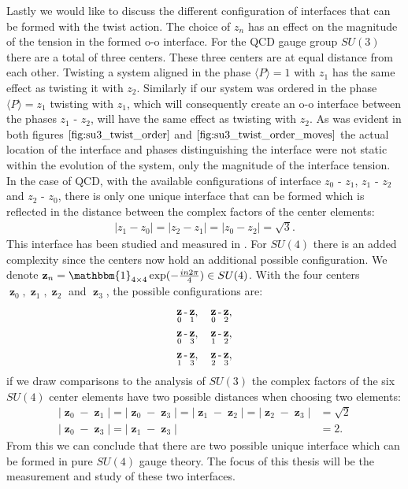 \documentclass[english,twoside,openright]{UH_TCM_MSc}
\DeclareMathOperator{\z}{\mathbf{z}}
\newcommand{\id}{\mathbbm{1}}
\begin{document}
Lastly we would like to discuss the different configuration of interfaces that can be formed with the twist action. The choice of $z_n$ has an effect on the magnitude of the tension in the formed o-o interface. For the QCD gauge group $SU(3)$ there are a total of three centers. These three centers are at equal distance from each other. Twisting a system aligned in the phase $\langle P \rangle = 1$ with $z_1$ has the same effect as twisting it with $z_2$. Similarly if our system was ordered in the phase  $\langle P \rangle = z_1$ twisting with $z_1$, which will consequently create an o-o interface between the phases $z_1$ - $z_2$, will have the same effect as twisting with $z_2$. As was evident in both figures $\ref{fig:su3_twist_order}$ and $\ref{fig:su3_twist_order_moves}$ the actual location of the interface and phases distinguishing the interface were not static within the evolution of the system, only the magnitude of the interface tension. In the case of QCD, with the available configurations of interface $z_0$ - $z_1$, $z_1$ - $z_2$ and $z_2$ - $z_0$, there is only one unique interface that can be formed which is reflected in the distance between the complex factors of the center elements:
\begin{align}
    |z_1 - z_0| = |z_2 - z_1| = |z_0 - z_2| = \sqrt{3}.
\end{align}
This interface has been studied and measured in \cite{twist}. For $SU(4)$ there is an added complexity since the centers now hold an additional possible configuration. We denote $\mathbf{z}_n = \id_{4\times 4} \exp(-\frac{in2\pi}{4}) \in SU(4)$. With the four centers $\z_0,\z_1,\z_2$ and $\z_3$, the possible configurations are:
\begin{align*}
    \z_0 \text{-} \z_1, \hspace{10px} \z_0 \text{-} \z_2, \\
    \z_0 \text{-} \z_3, \hspace{10px} \z_1 \text{-} \z_2, \\
    \z_1 \text{-} \z_3, \hspace{10px} \z_2 \text{-} \z_3,
\end{align*}
if we draw comparisons to the analysis of $SU(3)$ the complex factors of the six $SU(4)$ center elements have two possible distances when choosing two elements:
\begin{align}
    |\z_0 - \z_1| = |\z_0 - \z_3| =  |\z_1 - \z_2| = |\z_2 - \z_3| &= \sqrt{2} \\
    |\z_0 - \z_3| = |\z_1 - \z_3| &= 2.
\end{align}
From this we can conclude that there are two possible unique interface which can be formed in pure $SU(4)$ gauge theory. The focus of this thesis will be the measurement and study of these two interfaces.
\end{document}
